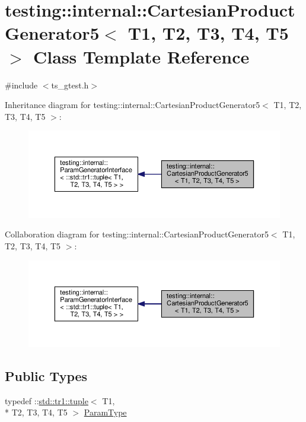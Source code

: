 \hypertarget{classtesting_1_1internal_1_1CartesianProductGenerator5}{\section{testing\-:\-:internal\-:\-:Cartesian\-Product\-Generator5$<$ T1, T2, T3, T4, T5 $>$ Class Template Reference}
\label{classtesting_1_1internal_1_1CartesianProductGenerator5}
}


{\ttfamily \#include $<$ts\-\_\-gtest.\-h$>$}



Inheritance diagram for testing\-:\-:internal\-:\-:Cartesian\-Product\-Generator5$<$ T1, T2, T3, T4, T5 $>$\-:\nopagebreak
\begin{figure}[H]
\begin{center}
\leavevmode
\includegraphics[width=350pt]{classtesting_1_1internal_1_1CartesianProductGenerator5__inherit__graph}
\end{center}
\end{figure}


Collaboration diagram for testing\-:\-:internal\-:\-:Cartesian\-Product\-Generator5$<$ T1, T2, T3, T4, T5 $>$\-:\nopagebreak
\begin{figure}[H]
\begin{center}
\leavevmode
\includegraphics[width=350pt]{classtesting_1_1internal_1_1CartesianProductGenerator5__coll__graph}
\end{center}
\end{figure}
\subsection*{Public Types}
\begin{DoxyCompactItemize}
\item 
typedef \-::\hyperlink{classstd_1_1tr1_1_1tuple}{std\-::tr1\-::tuple}$<$ T1, \\*
T2, T3, T4, T5 $>$ \hyperlink{classtesting_1_1internal_1_1CartesianProductGenerator5_a081ee8effde35f8caa9ec79cf9c29cbd}{Param\-Type}
\end{DoxyCompactItemize}

